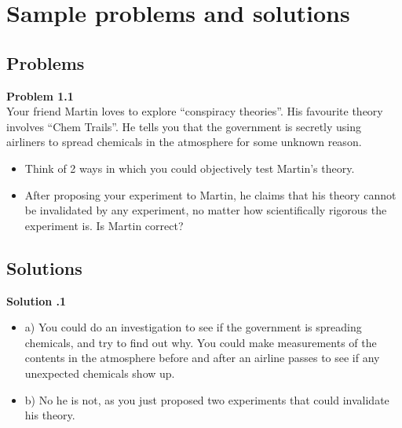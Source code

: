 \documentclass[9pt,Preprint]{lapreprint}
\begin{document}
\section{Sample problems and solutions}

\subsection{Problems}

\begin{framed}
\textbf{Problem 1.1}\\
Your friend Martin loves to explore ``conspiracy theories''. His favourite theory involves ``Chem Trails''. He tells you that the government is secretly using airliners to spread chemicals in the atmosphere for some unknown reason.

\begin{itemize}
\item Think of 2 ways in which you could objectively test Martin's theory.
\item After proposing your experiment to Martin, he claims that his theory cannot be invalidated by any experiment, no matter how scientifically rigorous the experiment is. Is Martin correct?
\end{itemize}
\end{framed}

\subsection{Solutions}

\begin{framed}
\textbf{Solution .1}\\
\begin{itemize}
\item a) You could do an investigation to see if the government is spreading chemicals, and try to find out why. You could make measurements of the contents in the atmosphere before and after an airline passes to see if any unexpected chemicals show up.


\item b) No he is not, as you just proposed two experiments that could invalidate his theory.
\end{itemize}
\end{framed}

\printbibliography

\if@endfloat\clearpage\processdelayedfloats\clearpage\fi



\end{document}

